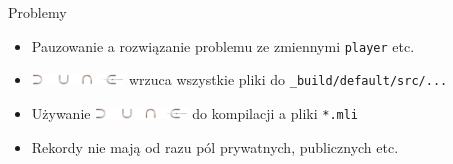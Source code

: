 \documentclass{beamer}
\begin{document}
\begin{frame}{Problemy}
  \begin{itemize}
    \item Pauzowanie a rozwiązanie problemu ze zmiennymi \lstinline{player} etc.
    \item \includegraphics[height=3mm]{dune_logo.png} wrzuca wszystkie pliki do \lstinline{_build/default/src/...}
    \item Używanie \includegraphics[height=3mm]{dune_logo.png} do kompilacji a pliki \lstinline{*.mli}
    \item Rekordy nie mają od razu pól prywatnych, publicznych etc.
  \end{itemize}


\end{frame}
\end{document}
